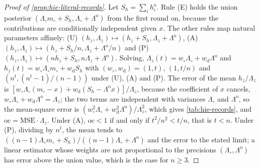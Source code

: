 \begin{proof}[Proof of \cref{prop:hie-literal-records}]
Let $S_h=\sum_ih^{\mathrm o}_i$. Rule (E) holds the union posterior $(\Lambda_\circ m_\circ+S_h,\Lambda_\circ+\Lambda^{\mathrm o})$ from the first round on, because the contributions are conditionally independent given $x$. The other rules map natural parameters affinely: (U) $(h_z,\Lambda_z)\mapsto(h_z+S_h,\Lambda_z+\Lambda^{\mathrm o})$, (A) $(h_z,\Lambda_z)\mapsto(h_z+S_h/n,\Lambda_z+\Lambda^{\mathrm o}/n)$ and (P) $(h_z,\Lambda_z)\mapsto(nh_z+S_h,n\Lambda_z+\Lambda^{\mathrm o})$. Solving, $\Lambda_z(t)=w_\circ\Lambda_\circ+w_{\mathrm d}\Lambda^{\mathrm o}$ and $h_z(t)=w_\circ\Lambda_\circ m_\circ+w_{\mathrm d}S_h$ with $(w_\circ,w_{\mathrm d})=(1,t)$, $(1,t/n)$ and $(n^t,(n^t-1)/(n-1))$ under (U), (A) and (P). The error of the mean $h_z/\Lambda_z$ is $[w_\circ\Lambda_\circ(m_\circ-x)+w_{\mathrm d}(S_h-\Lambda^{\mathrm o}x)]/\Lambda_z$, because the coefficient of $x$ cancels, $w_\circ\Lambda_\circ+w_{\mathrm d}\Lambda^{\mathrm o}=\Lambda_z$; the two terms are independent with variances $\Lambda_\circ$ and $\Lambda^{\mathrm o}$, so the mean-square error is $(w_\circ^2\Lambda_\circ+w_{\mathrm d}^2\Lambda^{\mathrm o})/\Lambda_z^2$, which gives \cref{tab:hie-records}, and $\mathrm{oc}=\mathrm{MSE}\cdot\Lambda_z$. Under (A), $\mathrm{oc}<1$ if and only if $t^2/n^2<t/n$, that is $t<n$. Under (P), dividing by $n^t$, the mean tends to $((n-1)\Lambda_\circ m_\circ+S_h)/((n-1)\Lambda_\circ+\Lambda^{\mathrm o})$ and the error to the stated limit; a linear estimator whose weights are not proportional to the precisions $(\Lambda_\circ,\Lambda^{\mathrm o})$ has error above the union value, which is the case for $n\ge3$.
\end{proof}

